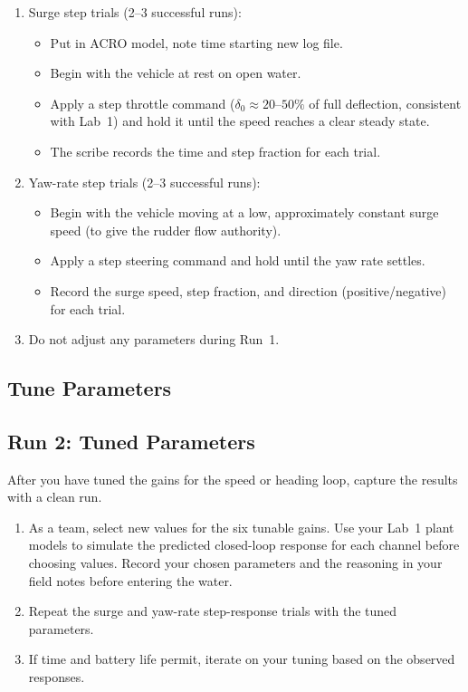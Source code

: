 \documentclass[../../book.tex]{subfiles}
\begin{document}
\begin{enumerate}
  \item Surge step trials (2--3 successful runs):
    \begin{itemize}
      \item Put in ACRO model, note time starting new log file.
      \item Begin with the vehicle at rest on open water.
      \item Apply a step throttle command ($\delta_0 \approx 20$--$50\%$ of full deflection, consistent with Lab~1) and hold it until the speed reaches a clear steady state.
      \item The scribe records the time and step fraction for each trial.
    \end{itemize}

  \item Yaw-rate step trials (2--3 successful runs):
    \begin{itemize}
      \item Begin with the vehicle moving at a low, approximately constant surge speed (to give the rudder flow authority).
      \item Apply a step steering command and hold until the yaw rate settles.
      \item Record the surge speed, step fraction, and direction (positive/negative) for each trial.
    \end{itemize}

  \item Do not adjust any parameters during Run~1.
\end{enumerate}


\subsection{Tune Parameters}


\subsection{Run 2: Tuned Parameters}

After you have tuned the gains for the speed or heading loop, capture the results with a clean run.


\begin{enumerate}
  \item As a team, select new values for the six tunable gains. 
    Use your Lab~1 plant models to simulate the predicted closed-loop response for each channel before choosing values.  Record your chosen parameters and the reasoning in your field notes before entering the water.
  \item Repeat the surge and yaw-rate step-response trials with the tuned parameters.
  \item If time and battery life permit, iterate on your tuning based on the observed responses.
\end{enumerate}
\end{document}
